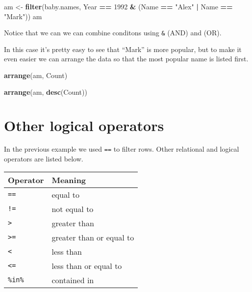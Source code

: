 \documentclass[]{book}
\newenvironment{Shaded}{\begin{snugshade}}{\end{snugshade}}
\newcommand{\KeywordTok}[1]{\textcolor[rgb]{0.13,0.29,0.53}{\textbf{#1}}}
\newcommand{\DecValTok}[1]{\textcolor[rgb]{0.00,0.00,0.81}{#1}}
\newcommand{\StringTok}[1]{\textcolor[rgb]{0.31,0.60,0.02}{#1}}
\newcommand{\OperatorTok}[1]{\textcolor[rgb]{0.81,0.36,0.00}{\textbf{#1}}}
\newcommand{\NormalTok}[1]{#1}
\begin{document}
\begin{Shaded}
\begin{Highlighting}[]
\NormalTok{am <-}\StringTok{ }\KeywordTok{filter}\NormalTok{(baby.names, }
\NormalTok{             Year }\OperatorTok{==}\StringTok{ }\DecValTok{1992} \OperatorTok{&}\StringTok{ }\NormalTok{(Name }\OperatorTok{==}\StringTok{ "Alex"} \OperatorTok{|}\StringTok{ }\NormalTok{Name }\OperatorTok{==}\StringTok{ "Mark"}\NormalTok{))}
\NormalTok{am}
\end{Highlighting}
\end{Shaded}

Notice that we can we can combine conditons using \texttt{\&} (AND) and
\texttt{\textbar{}} (OR).

In this case it's pretty easy to see that ``Mark'' is more popular, but
to make it even easier we can arrange the data so that the most popular
name is listed first.

\begin{Shaded}
\begin{Highlighting}[]
\KeywordTok{arrange}\NormalTok{(am, Count)}
\end{Highlighting}
\end{Shaded}

\begin{Shaded}
\begin{Highlighting}[]
\KeywordTok{arrange}\NormalTok{(am, }\KeywordTok{desc}\NormalTok{(Count))}
\end{Highlighting}
\end{Shaded}

\section{Other logical operators}\label{other-logical-operators}

In the previous example we used \texttt{==} to filter rows. Other
relational and logical operators are listed below.

\begin{longtable}[]{@{}ll@{}}
\toprule
Operator & Meaning\tabularnewline
\midrule
\endhead
\texttt{==} & equal to\tabularnewline
\texttt{!=} & not equal to\tabularnewline
\texttt{\textgreater{}} & greater than\tabularnewline
\texttt{\textgreater{}=} & greater than or equal to\tabularnewline
\texttt{\textless{}} & less than\tabularnewline
\texttt{\textless{}=} & less than or equal to\tabularnewline
\texttt{\%in\%} & contained in\tabularnewline
\bottomrule
\end{longtable}
\end{document}
